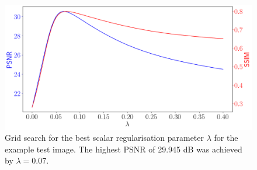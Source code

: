 \documentclass[12pt]{article}
\begin{document}
\begin{figure}[H]
  \centering
  \includegraphics[width=0.6\linewidth]{images//chest_xray/ex_2/pyplot_multiple_y-axis.PNG}
  
      \caption{Grid search for the best scalar regularisation parameter $\lambda$ for the example test image. The highest PSNR of 29.945 dB was achieved by $\lambda = 0.07$.}
  \label{fig:line_plots}
\end{figure}







  
      



\end{document}
